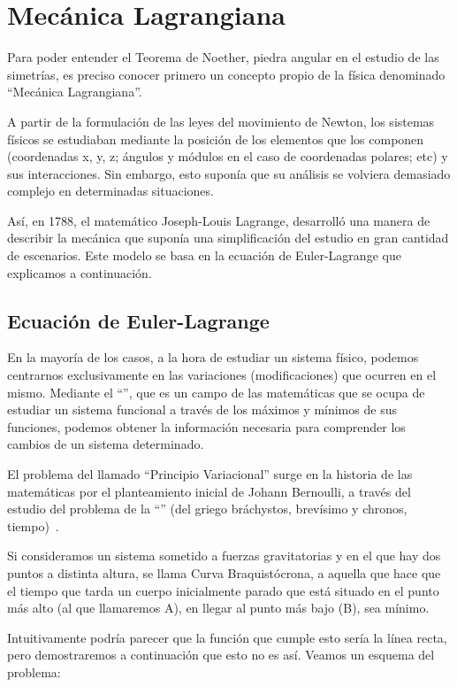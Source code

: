 \section{Mecánica Lagrangiana}\label{sec:mecánica-lagrangiana}
Para poder entender el Teorema de Noether, piedra angular en el estudio de las simetrías, es preciso conocer primero un concepto propio de la física denominado ``Mecánica Lagrangiana''.

A partir de la formulación de las leyes del movimiento de Newton, los sistemas físicos se estudiaban mediante la posición de los elementos que los componen (coordenadas x, y, z; ángulos y módulos en el caso de coordenadas polares; etc) y sus interacciones.
Sin embargo, esto suponía que su análisis se volviera demasiado complejo en determinadas situaciones.

Así, en 1788, el matemático Joseph-Louis Lagrange, desarrolló una manera de describir la mecánica que suponía una simplificación del estudio en gran cantidad de escenarios. Este modelo se basa en la ecuación de Euler-Lagrange que explicamos a continuación.

\subsection{Ecuación de Euler-Lagrange}\label{subsec:ecuación-de-euler-lagrange}
En la mayoría de los casos, a la hora de estudiar un sistema físico, podemos centrarnos exclusivamente en las variaciones (modificaciones) que ocurren en el mismo. Mediante el ``'', que es un campo de las matemáticas que se ocupa de estudiar un sistema funcional a través de los máximos y mínimos de sus funciones, podemos obtener la información necesaria para comprender los cambios de un sistema determinado.

El problema del llamado ``Principio Variacional'' surge en la historia de las matemáticas por el planteamiento inicial de Johann Bernoulli, a través del estudio del problema de la ``'' (del griego bráchystos, brevísimo y chronos, tiempo)~\cite{AE}.

Si consideramos un sistema sometido a fuerzas gravitatorias y en el que hay dos puntos a distinta altura, se llama Curva Braquistócrona, a aquella que hace que el tiempo que tarda un cuerpo inicialmente parado que está situado en el punto más alto (al que llamaremos A), en llegar al punto más bajo (B), sea mínimo.

Intuitivamente podría parecer que la función que cumple esto sería la línea recta, pero demostraremos a continuación que esto no es así. Veamos un esquema del problema:

